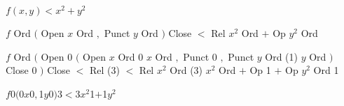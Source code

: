 $f(x,y)<x^2+y^2$

\obeylines
$f$ Ord
$($ Open
$x$ Ord
$,$ Punct
$y$ Ord
$)$ Close
$<$ Rel
$x^2$ Ord
$+$ Op
$y^2$ Ord


$f$ Ord $($ Open 0
$($ Open $x$ Ord 0
$x$ Ord $,$ Punct 0
$,$ Punct $y$ Ord (1)
$y$ Ord $)$ Close 0
$)$ Close $<$ Rel (3)
$<$ Rel $x^2$ Ord (3)
$x^2$ Ord $+$ Op 1
$+$ Op $y^2$ Ord 1

$f$0$($0$x$0$,$1$y$0$)$3$<$3$x^2$1$+$1$y^2$

\bye


